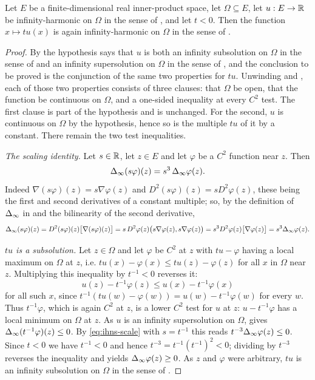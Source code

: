 \begin{lemma}
Let $E$ be a finite-dimensional real inner-product space, let $\Omega\subseteq E$,
let $u:E\to\mathbb{R}$ be infinity-harmonic on $\Omega$ in the sense of
, and let $t<0$. Then the function $x\mapsto tu(x)$ is
again infinity-harmonic on $\Omega$ in the sense of .
\end{lemma}
\begin{proof}
By  the hypothesis says that $u$ is both an infinity
subsolution on $\Omega$ in the sense of  and an
infinity supersolution on $\Omega$ in the sense of
, and the conclusion to be proved is the
conjunction of the same two properties for $tu$. Unwinding
 and , each of those
two properties consists of three clauses: that $\Omega$ be open, that the
function be continuous on $\Omega$, and a one-sided inequality at every $C^2$
test. The first clause is part of the hypothesis and is unchanged. For the
second, $u$ is continuous on $\Omega$ by the hypothesis, hence so is the
multiple $tu$ of it by a constant. There remain the two test inequalities.

\emph{The scaling identity.} Let $s\in\mathbb{R}$, let $z\in E$ and let $\varphi$ be a
$C^2$ function near $z$. Then
\begin{equation}\label{eq:ihns-scale}
  \Delta_{\infty}(s\varphi)(z)=s^3\,\Delta_{\infty}\varphi(z).
\end{equation}
Indeed $\nabla(s\varphi)(z)=s\nabla\varphi(z)$ and
$D^2(s\varphi)(z)=sD^2\varphi(z)$, these being the first and second derivatives
of a constant multiple; so, by the definition of $\Delta_{\infty}$ in  and
the bilinearity of the second derivative,
\[
  \Delta_{\infty}(s\varphi)(z)=D^2(s\varphi)(z)\bigl[\nabla(s\varphi)(z)\bigr]
   =s\,D^2\varphi(z)\bigl(s\nabla\varphi(z),s\nabla\varphi(z)\bigr)
   =s^3D^2\varphi(z)\bigl[\nabla\varphi(z)\bigr]
   =s^3\Delta_{\infty}\varphi(z).
\]

\emph{$tu$ is a subsolution.} Let $z\in\Omega$ and let $\varphi$ be $C^2$ at $z$
with $tu-\varphi$ having a local maximum on $\Omega$ at $z$, i.e.
$tu(x)-\varphi(x)\le tu(z)-\varphi(z)$ for all $x$ in $\Omega$ near $z$.
Multiplying this inequality by $t^{-1}<0$ reverses it:
\[
  u(z)-t^{-1}\varphi(z)\le u(x)-t^{-1}\varphi(x)
\]
for all such $x$, since $t^{-1}(tu(w)-\varphi(w))=u(w)-t^{-1}\varphi(w)$ for
every $w$. Thus $t^{-1}\varphi$, which is again $C^2$ at $z$, is a lower $C^2$
test for $u$ at $z$: $u-t^{-1}\varphi$ has a local minimum on $\Omega$ at $z$.
As $u$ is an infinity supersolution on $\Omega$,
 gives $\Delta_{\infty}(t^{-1}\varphi)(z)\le0$. By
\eqref{eq:ihns-scale} with $s=t^{-1}$ this reads $t^{-3}\Delta_{\infty}\varphi(z)\le0$.
Since $t<0$ we have $t^{-1}<0$ and hence $t^{-3}=t^{-1}(t^{-1})^2<0$; dividing
by $t^{-3}$ reverses the inequality and yields $\Delta_{\infty}\varphi(z)\ge0$. As $z$ and
$\varphi$ were arbitrary, $tu$ is an infinity subsolution on $\Omega$ in the
sense of .


\end{proof}
